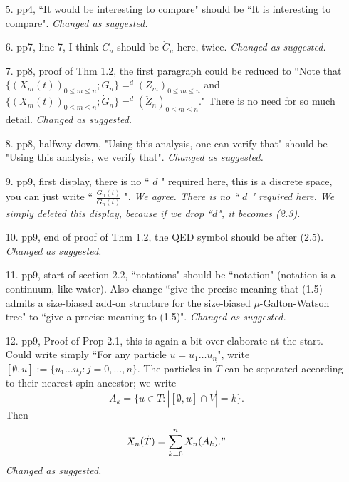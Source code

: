 \documentclass[12pt,a4paper]{amsart}
\numberwithin{equation}{section}
\begin{document}
\begin{itemize}
	{\it 
	Our previous heuristic is not very clear. We revised the heuristic in the new version,  see p. 5, after (1.9).}
\\
\item[5.]
	pp4, ``It would be interesting to compare" should be ``It is interesting to compare".
	{\it Changed as suggested.}
\\
\item[6.]
	pp7, line 7, I think $C_u$ should be $\dot C_u$ here, twice.
	{\it Changed as suggested.}
\\
\item[7.]
	pp8, proof of Thm 1.2, the first paragraph could be reduced to ``Note that $\{(X_m(t))_{0 \leq m \leq n}; G_n\} =^d (Z_m)_{0 \leq m \leq n}$ and $\{(X_m(t))_{0\leq m \leq n}; \dot G_n\} =^d (\ddot Z_n)_{0 \leq m \leq n}$." There is no need for so much detail.
	{\it Changed as suggested.}
\\	
\item[8.]
	pp8, halfway down, "Using this analysis, one can verify that" should be "Using this analysis, we verify that".
	{\it Changed as suggested.}
\\
\item[9.]
	pp9, first display, there is no `` $d$ " required here, this is a discrete space, you can just write `` $\frac{\ddot G_n(t)}{G_n(t)}$ ".
	{\it We agree.
		There is no `` $d$ " required here.
		We simply deleted this display, because if we drop
		``$d$", it becomes (2.3).}
\\
\item[10.]
	pp9, end of proof of Thm 1.2, the QED symbol should be after (2.5).
	{\it Changed as suggested.}
\\
\item[11.]
	pp9, start of section 2.2, ``notations" should be ``notation" (notation is a continuum, like water). Also change ``give the precise meaning that (1.5) admits a size-biased add-on structure for the size-biased $\mu$-Galton-Watson tree" to ``give a precise meaning to (1.5)".
	{\it Changed as suggested.}
\\	
\item[12.]
	pp9, Proof of Prop 2.1, this is again a bit over-elaborate at the start.
	Could write simply ``For any particle $u = u_1\dots u_n$", write $[\emptyset, u]:= \{u_1\dots u_j: j = 0,\dots, n\}$.
	The particles in $\dot T$ can be separated according to their nearest spin ancestor; we write
\[
	\dot A_k = \{ u \in \dot T: |[\emptyset, u] \cap \dot V| = k\}.
\]
	Then
\[
	X_n(\dot T) = \sum_{k=0}^n X_n(\dot A_k). "
\]
	{\it Changed as suggested.}

\end{itemize}
\end{document}
